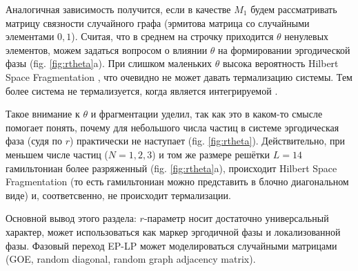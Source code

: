  



Аналогичная зависимость получится, если в качестве $M_1$ будем рассматривать матрицу связности случайного графа (эрмитова матрица со случайными элементами $0,1$). 
Считая, что в среднем на строчку приходится $\theta$ ненулевых элементов, можем задаться вопросом о влиянии $\theta$ на формировании эргодической фазы (fig. \ref{fig:rtheta}a). При слишком маленьких $\theta$ высока вероятность Hilbert Space Fragmentation \cite{Moudgalya_2022}, что очевидно не может давать термализацию системы. Тем более система не термализуется, когда является интегрируемой \cite{rigol_thermalization_2008}.

Такое внимание к $\theta$ и фрагментации уделил, так как это в каком-то смысле помогает понять, почему для небольшого числа частиц в системе эргодическая фаза (судя по $r$) практически не наступает (fig. \ref{fig:rtheta}). Действительно, при меньшем числе частиц ($N=1,2,3$) и том же размере решётки $L=14$ гамильтониан более разряженный (fig. \ref{fig:rtheta}a), происходит Hilbert Space Fragmentation (то есть гамильтониан можно представить в блочно диагональном виде) и, соответсвенно, не происходит термализации. 


Основной вывод этого раздела: $r$-параметр носит достаточно универсальный характер, может использоваться как маркер эргодичной фазы и локализованной фазы. Фазовый переход EP-LP может моделироваться случайными матрицами (GOE, random diagonal, random graph adjacency matrix).